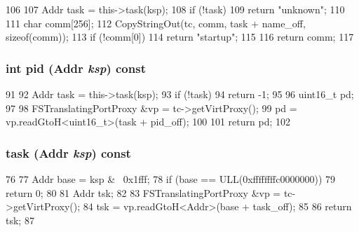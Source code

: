 \begin{DoxyCode}
106     {
107         Addr task = this->task(ksp);
108         if (!task)
109             return "unknown";
110 
111         char comm[256];
112         CopyStringOut(tc, comm, task + name_off, sizeof(comm));
113         if (!comm[0])
114             return "startup";
115 
116         return comm;
117     }
\end{DoxyCode}
\hypertarget{classArmISA_1_1ProcessInfo_a27d14b3fdb576a4081e5c58c55375042}{
\subsubsection[{pid}]{\setlength{\rightskip}{0pt plus 5cm}int pid ({\bf Addr} {\em ksp}) const}}
\label{classArmISA_1_1ProcessInfo_a27d14b3fdb576a4081e5c58c55375042}



\begin{DoxyCode}
91     {
92         Addr task = this->task(ksp);
93         if (!task)
94             return -1;
95 
96         uint16_t pd;
97 
98         FSTranslatingPortProxy &vp = tc->getVirtProxy();
99         pd = vp.readGtoH<uint16_t>(task + pid_off);
100 
101         return pd;
102     }
\end{DoxyCode}
\hypertarget{classArmISA_1_1ProcessInfo_a05de971c556b8e4418a60289f92dfba3}{
\subsubsection[{task}]{ task ({\bf Addr} {\em ksp}) const}}
\label{classArmISA_1_1ProcessInfo_a05de971c556b8e4418a60289f92dfba3}



\begin{DoxyCode}
76     {
77         Addr base = ksp & ~0x1fff;
78         if (base == ULL(0xffffffffc0000000))
79             return 0;
80 
81         Addr tsk;
82 
83         FSTranslatingPortProxy &vp = tc->getVirtProxy();
84         tsk = vp.readGtoH<Addr>(base + task_off);
85 
86         return tsk;
87     }
\end{DoxyCode}


